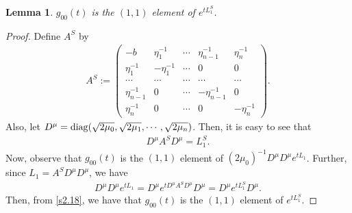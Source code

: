 \documentclass[a4paper,12pt]{article}
\newtheorem{lemma}[Th]{Lemma}
\newtheorem{a priori condition}[Th]{A priori condition}
\begin{document}
\begin{lemma}\label{s_lem2.2}
$g_{00}(t)$ is the $(1,1)$ element of $e^{tL_1^S}$. 
\end{lemma}
\begin{proof}
Define $A^S$ by
\begin{equation}\label{s2.16}
\begin{aligned}
A^S:=
\begin{pmatrix}
                       -b
                       & \eta_1^{-1} & \cdots     & \eta_{n-1}^{-1}           &    \eta_n^{-1}  \\

                             \eta_1^{-1}                           & -\eta_1^{-1} & \cdots     &    0               &            0         \\
            \cdots                                   & \cdots                   & \cdots     & \cdots             & \cdots               \\
                               \eta_{n-1}^{-1}                                & 0              & \cdots     & -\eta_{n-1}^{-1}     &            0         \\
                             \eta_n^{-1}                               & 0              & \cdots     &    0               &    -\eta_n^{-1}
\end{pmatrix}.
\end{aligned}
\end{equation}
Also, let $D^{\mu}={\rm diag}(\sqrt{2\mu_0},\sqrt{2\mu_1},\cdots,\sqrt{2\mu_n})$. Then, it is easy to see that 
\begin{equation}\label{s2.17}
\begin{aligned}
D^{\mu}A^SD^{\mu}=L_1^S.
\end{aligned}
\end{equation}
Now, observe that $g_{00}(t)$ is the $(1,1)$ element of $(2\mu_0)^{-1}D^{\mu}D^{\mu}e^{tL_1}$. Further, since $L_1=A^SD^{\mu}D^{\mu}$, we have 
\begin{equation}\label{s2.18}
\begin{aligned}
D^{\mu}D^{\mu}e^{tL_1}=D^{\mu}e^{tD^{\mu}A^SD^{\mu}}D^{\mu}=D^{\mu}e^{tL_1^S}D^{\mu}.
\end{aligned}
\end{equation}
Then, from \eqref{s2.18}, we have that $g_{00}(t)$ is the $(1,1)$ element of $e^{tL_1^S}$.

\end{proof}
\end{document}
